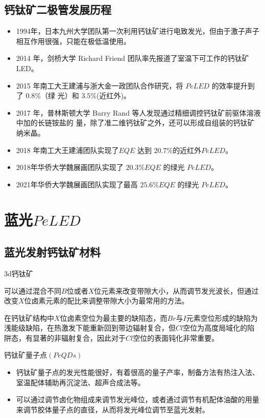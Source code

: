 \documentclass{beamer}[fontset=windows]
\begin{document}
\subsection{钙钛矿二极管发展历程}
\begin{frame}
\begin{itemize}
	\item 1994年，日本九州大学团队第一次利用钙钛矿进行电致发光，但由于激子声子相互作用很强，只能在极低温使用。
	\item 2014 年，剑桥大学 Richard Friend 团队率先报道了室温下可工作的钙钛矿 LED。
	\item 2015 年南工大王建浦与浙大金一政团队合作研究，将 $PeLED$ 的效率提升到了 $0.8\%$（绿
	光）和 $3.5\%$(近红外)。
	\item 2017 年，普林斯顿大学 Barry Rand 等人发现通过精细调控钙钛矿前驱体溶液中加的长链铵盐的
	量，除了准二维钙钛矿之外，还可以形成自组装的钙钛矿纳米晶。
	\item 2018 年南工大王建浦团队实现了$ EQE$ 达到 $20.7\%$的近红外$PeLED$。
	\item 2018年华侨大学魏展画团队实现了 $20.3\%EQE$ 的绿光 $PeLED$。
	\item 2021年华侨大学魏展画团队实现了最高 $25.6\%EQE$ 的绿光 $PeLED$。
\end{itemize}
\end{frame}
\section{蓝光$PeLED$}
\subsection{蓝光发射钙钛矿材料}
\begin{frame}
\begin{block}{3d钙钛矿}
\begin{itemize}\small{
\item 可以通过混合不同$B$位或者$X$位元素来改变带隙大小，从而调节发光波长，但通过改变$X$位卤素元素的配比来调整带隙大小为最常用的方法。
\item 在钙钛矿结构中$X$位卤素空位为最主要的缺陷态，而$Br$与$I$元素空位形成的缺陷为浅能级缺陷，在热激发下能重新回到带边辐射复合，但$Cl$空位为高度局域化的陷阱态，有显著的非辐射复合，因此对于$Cl$空位的表面钝化非常重要。}
\end{itemize}
\end{block}
\begin{block}{钙钛矿量子点$(PeQDs)$}
\begin{itemize}
\item 钙钛矿量子点的发光性能很好，有着很高的量子产率，制备方法有热注入法、室温配体辅助再沉淀法、超声合成法等。
\item 可以通过调节卤化物组成来调节发光峰位，或者通过调节有机配体油酸的用量来调节胶体量子点的直径，从而将发光峰位调节至蓝光发射。
\end{itemize}
\end{block}
\end{frame}
\end{document}
